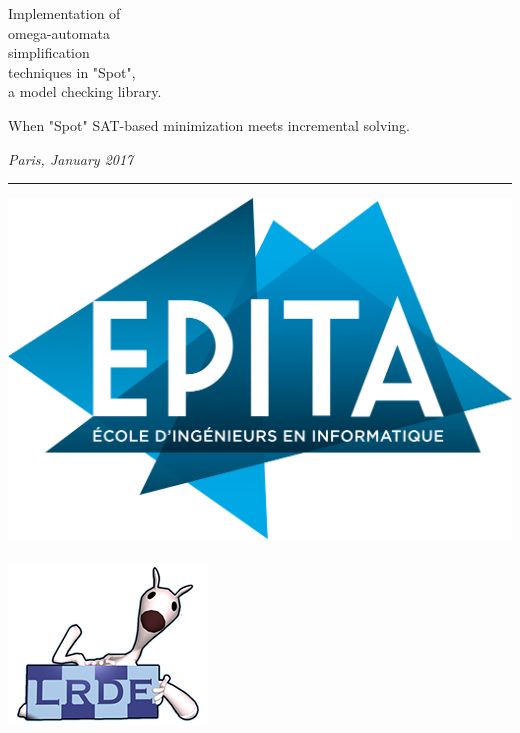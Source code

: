 \begin{titlepage}
\noindent \titlefont Implementation of \\
omega-automata \\
simplification \\
techniques in "Spot", \\
a model checking library.\par
\epigraph{When "Spot" SAT-based minimization meets incremental solving.}%
{\textit{Paris, January 2017}}
\null\vfill
\vspace*{1cm}
\noindent
\hfill%
%
\noindent\begin{minipage}{0.7\textwidth}
    \begin{flushright}
        \printauthor
    \end{flushright}
\end{minipage}%
%
\begin{minipage}{0.1\linewidth}%
  \hspace{0.5cm}%
  \rule{5pt}{200pt}%
\end{minipage}%
%
\begin{minipage}{0.3\textwidth}%
  \includegraphics[width=\linewidth]{./img/epita.png}%
  \\%
  \\%
  \includegraphics[width=\linewidth]{./img/lrde.png}%
\end{minipage}%
%
\titlepagedecoration
%
\end{titlepage}